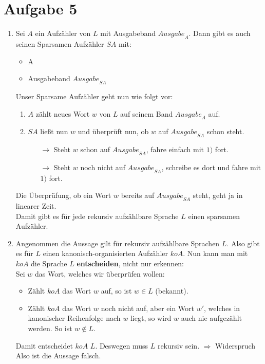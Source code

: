 \documentclass[a4paper,11pt]{scrartcl}
\begin{document}
	\section*{Aufgabe 5}
	\begin{enumerate}[label=(\alph*)]
	\item	Sei $A$ ein Aufzähler von $L$ mit Ausgabeband ${Ausgabe}_A$. Dann gibt es auch seinen Sparsamen Aufzähler $SA$ mit:
			\begin{itemize}
			\item A
			\item Ausgabeband ${Ausgabe}_{SA}$
			\end{itemize}
			Unser Sparsame Aufzähler geht nun wie folgt vor:
			\begin{enumerate}[label=\arabic*)]
			\item $A$ zählt neues Wort $w$ von $L$ auf seinem Band ${Ausgabe}_A$ auf.
			\item $SA$ ließt nun $w$ und überprüft nun, ob $w$ auf ${Ausgabe}_{SA}$ schon steht.
				\begin{itemize}
				\item[$\rightarrow$] Steht $w$ schon auf ${Ausgabe}_{SA}$, fahre einfach mit $1)$ fort.
				\item[$\rightarrow$] Steht $w$ noch nicht auf ${Ausgabe}_{SA}$, schreibe es dort und fahre mit $1)$ fort.
				\end{itemize}
			\end{enumerate}
			Die Überprüfung, ob ein Wort $w$ bereits auf ${Ausgabe}_{SA}$ steht, geht ja in linearer Zeit.\\
			Damit gibt es für jede rekursiv aufzählbare Sprache $L$ einen sparsamen Aufzähler.
	
	\item	Angenommen die Aussage gilt für rekursiv aufzählbare Sprachen $L$. Also gibt es für $L$ einen kanonisch-organisierten Aufzähler $koA$. Nun kann man mit $koA$ die Sprache $L$ \textbf{entscheiden}, nicht nur erkennen:\\
			Sei $w$ das Wort, welches wir überprüfen wollen:
			\begin{itemize}
			\item Zählt $koA$ das Wort $w$ auf, so ist $w \in L$ (bekannt).
			\item Zählt $koA$ das Wort $w$ noch nicht auf, aber ein Wort $w'$, welches in kanonischer Reihenfolge nach $w$ liegt, so wird $w$ auch nie aufgezählt werden. So ist $w \not\in L$.
			\end{itemize}
			Damit entscheidet $koA$ $L$. Deswegen muss $L$ rekursiv sein. $\Rightarrow$ Widerspruch \\
			Also ist die Aussage falsch.
	\end{enumerate}
	
\end{document}
